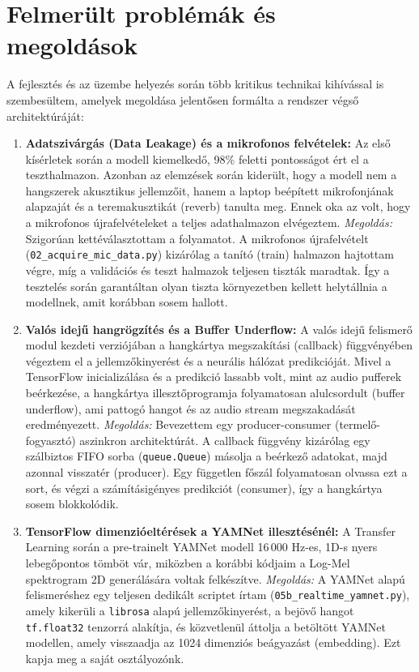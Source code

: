\section{Felmerült problémák és megoldások}
\label{sec:problemak}

A fejlesztés és az üzembe helyezés során több kritikus technikai kihívással is szembesültem, amelyek megoldása jelentősen formálta a rendszer végső architektúráját:

\begin{enumerate}
    \item \textbf{Adatszivárgás (Data Leakage) és a mikrofonos felvételek:}
    Az első kísérletek során a modell kiemelkedő, 98\% feletti pontosságot ért el a teszthalmazon. Azonban az elemzések során kiderült, hogy a modell nem a hangszerek akusztikus jellemzőit, hanem a laptop beépített mikrofonjának alapzaját és a teremakusztikát (reverb) tanulta meg. Ennek oka az volt, hogy a mikrofonos újrafelvételeket a teljes adathalmazon elvégeztem. 
    \textit{Megoldás:} Szigorúan kettéválasztottam a folyamatot. A mikrofonos újrafelvételt (\texttt{02\_acquire\_mic\_data.py}) kizárólag a tanító (train) halmazon hajtottam végre, míg a validációs és teszt halmazok teljesen tiszták maradtak. Így a tesztelés során garantáltan olyan tiszta környezetben kellett helytállnia a modellnek, amit korábban sosem hallott.

    \item \textbf{Valós idejű hangrögzítés és a Buffer Underflow:}
    A valós idejű felismerő modul kezdeti verziójában a hangkártya megszakítási (callback) függvényében végeztem el a jellemzőkinyerést és a neurális hálózat predikcióját. Mivel a TensorFlow inicializálása és a predikció lassabb volt, mint az audio pufferek beérkezése, a hangkártya illesztőprogramja folyamatosan alulcsordult (buffer underflow), ami pattogó hangot és az audio stream megszakadását eredményezett.
    \textit{Megoldás:} Bevezettem egy producer-consumer (termelő-fogyasztó) aszinkron architektúrát. A callback függvény kizárólag egy szálbiztos FIFO sorba (\texttt{queue.Queue}) másolja a beérkező adatokat, majd azonnal visszatér (producer). Egy független főszál folyamatosan olvassa ezt a sort, és végzi a számításigényes predikciót (consumer), így a hangkártya sosem blokkolódik.

    \item \textbf{TensorFlow dimenzióeltérések a YAMNet illesztésénél:}
    A Transfer Learning során a pre-trainelt YAMNet modell 16\,000 Hz-es, 1D-s nyers lebegőpontos tömböt vár, miközben a korábbi kódjaim a Log-Mel spektrogram 2D generálására voltak felkészítve.
    \textit{Megoldás:} A YAMNet alapú felismeréshez egy teljesen dedikált scriptet írtam (\texttt{05b\_realtime\_yamnet.py}), amely kikerüli a \texttt{librosa} alapú jellemzőkinyerést, a bejövő hangot \texttt{tf.float32} tenzorrá alakítja, és közvetlenül áttolja a betöltött YAMNet modellen, amely visszaadja az 1024 dimenziós beágyazást (embedding). Ezt kapja meg a saját osztályozónk.
\end{enumerate}

